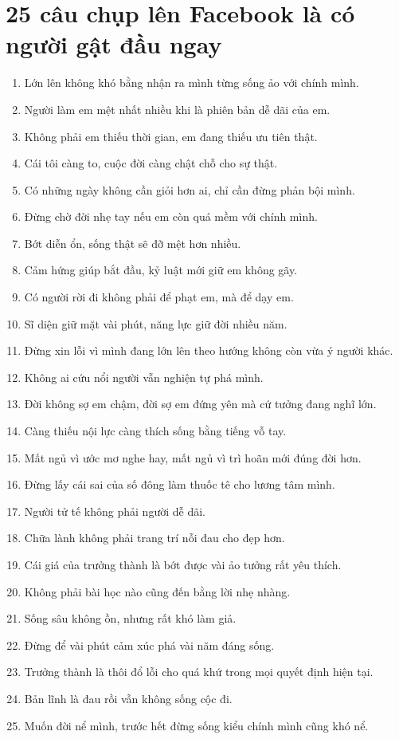 \section{25 câu chụp lên Facebook là có người gật đầu ngay}
\begin{enumerate}[leftmargin=*]
\item Lớn lên không khó bằng nhận ra mình từng sống ảo với chính mình.
\item Người làm em mệt nhất nhiều khi là phiên bản dễ dãi của em.
\item Không phải em thiếu thời gian, em đang thiếu ưu tiên thật.
\item Cái tôi càng to, cuộc đời càng chật chỗ cho sự thật.
\item Có những ngày không cần giỏi hơn ai, chỉ cần đừng phản bội mình.
\item Đừng chờ đời nhẹ tay nếu em còn quá mềm với chính mình.
\item Bớt diễn ổn, sống thật sẽ đỡ mệt hơn nhiều.
\item Cảm hứng giúp bắt đầu, kỷ luật mới giữ em không gãy.
\item Có người rời đi không phải để phạt em, mà để dạy em.
\item Sĩ diện giữ mặt vài phút, năng lực giữ đời nhiều năm.
\item Đừng xin lỗi vì mình đang lớn lên theo hướng không còn vừa ý người khác.
\item Không ai cứu nổi người vẫn nghiện tự phá mình.
\item Đời không sợ em chậm, đời sợ em đứng yên mà cứ tưởng đang nghĩ lớn.
\item Càng thiếu nội lực càng thích sống bằng tiếng vỗ tay.
\item Mất ngủ vì ước mơ nghe hay, mất ngủ vì trì hoãn mới đúng đời hơn.
\item Đừng lấy cái sai của số đông làm thuốc tê cho lương tâm mình.
\item Người tử tế không phải người dễ dãi.
\item Chữa lành không phải trang trí nỗi đau cho đẹp hơn.
\item Cái giá của trưởng thành là bớt được vài ảo tưởng rất yêu thích.
\item Không phải bài học nào cũng đến bằng lời nhẹ nhàng.
\item Sống sâu không ồn, nhưng rất khó làm giả.
\item Đừng để vài phút cảm xúc phá vài năm đáng sống.
\item Trưởng thành là thôi đổ lỗi cho quá khứ trong mọi quyết định hiện tại.
\item Bản lĩnh là đau rồi vẫn không sống cộc đi.
\item Muốn đời nể mình, trước hết đừng sống kiểu chính mình cũng khó nể.
\end{enumerate}

